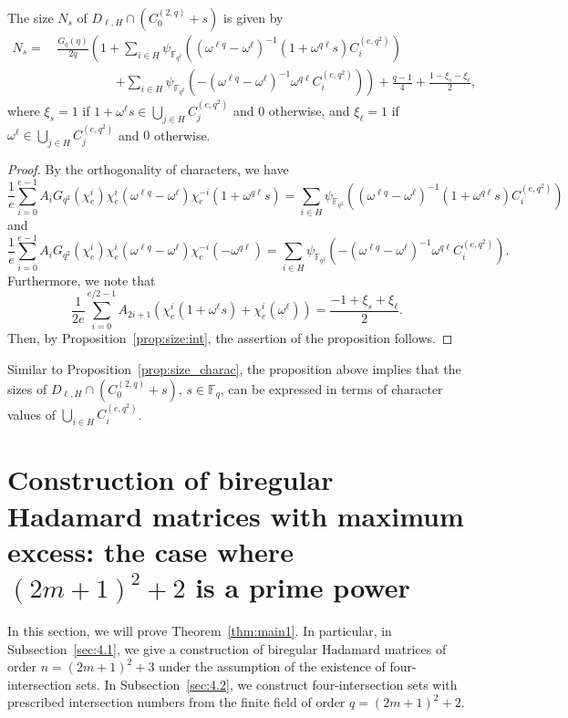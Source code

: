 \documentclass[ALCO,ThmDefs,Unicode]{cedram}
\newcommand*\F{{\mathbb F}}
\begin{document}
\begin{prop}\label{prop:size:int2}
The size $N_s$ of $D_{\ell,H}\cap (C_0^{(2,q)}+s)$ is given by
\begin{align*}
N_s=&\, \frac{G_q(\eta)}{2q}\left(1+
\sum_{i\in H}\psi_{\F_{q^2}}((\omega^{\ell q}-\omega^\ell)^{-1}(1+\omega^{q\ell} s)C_i^{(e,q^2)})\right.\\
&\hspace{2cm}\left.+\sum_{i\in H}\psi_{\F_{q^2}}(-(\omega^{\ell q}-\omega^\ell)^{-1}\omega^{q\ell}C_i^{(e,q^2)})\right) +\frac{q-1}{4}+\frac{1-\xi_s-\xi_\ell}{2},
\end{align*}
where $\xi_s=1$ if $1+\omega^\ell s\in \bigcup_{j\in H}C_j^{(e,q^2)}$ and $0$ otherwise, and $\xi_\ell=1$ if $\omega^\ell\in \bigcup_{j\in H}C_j^{(e,q^2)}$ and $0$ otherwise.
\end{prop}
\begin{proof}
By the orthogonality of characters, we have
\[
\frac{1}{e}\sum_{i=0}^{e-1}A_{i} G_{q^2}(\chi_e^{i})\chi_e^{i}(\omega^{\ell q}-\omega^\ell)
\chi_e^{-i}(1+\omega^{q\ell} s)=
\sum_{i\in H}\psi_{\F_{q^2}}((\omega^{\ell q}-\omega^\ell)^{-1}(1+\omega^{q\ell} s)C_i^{(e,q^2)})
\]
and
\[
\frac{1}{e}\sum_{i=0}^{e-1}A_{i} G_{q^2}(\chi_e^{i})\chi_e^{i}(\omega^{\ell q}-\omega^\ell)
\chi_e^{-i}(-\omega^{q\ell})=
\sum_{i\in H}\psi_{\F_{q^2}}(-(\omega^{\ell q}-\omega^\ell)^{-1}\omega^{q\ell}C_i^{(e,q^2)}).
\]
Furthermore, we note that
\[
\frac{1}{2e}\sum_{i=0}^{e/2-1}A_{2i+1}(\chi_e^i(1+\omega^\ell s)+\chi_e^i(\omega^\ell))=\frac{-1+\xi_s+\xi_\ell}{2}.
\]
Then, by Proposition~\ref{prop:size:int}, the assertion of the proposition follows.
\end{proof}

\vspace{0.3cm}

Similar to Proposition~\ref{prop:size_charac}, the proposition above implies that the sizes of $D_{\ell,H}\cap (C_0^{(2,q)}+s)$, $s\in \F_q$, can be expressed in terms of character values of $\bigcup_{i\in H}C_i^{(e,q^2)}$.

\section{Construction of biregular Hadamard matrices with maximum excess: the case where \texorpdfstring{$(2m+1)^2+2$}{(2m+1)2+2} is a prime power}\label{sec:const1}
In this section, we will prove Theorem~\ref{thm:main1}. In particular, in Subsection~\ref{sec:4.1}, we give a construction of biregular Hadamard matrices of order $n=(2m+1)^2+3$ under the assumption of the existence of four-intersection sets. In Subsection~\ref{sec:4.2}, we construct four-intersection sets with prescribed intersection numbers from the finite field of order $q=(2m+1)^2+2$.
\end{document}
